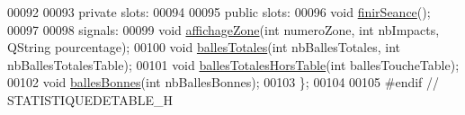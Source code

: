 \begin{DoxyCode}
00092 
00093     \textcolor{keyword}{private} slots:
00094 
00095     \textcolor{keyword}{public} slots:
00096         \textcolor{keywordtype}{void} \hyperlink{class_statistiques_seance_a72526ea18d6c534a1cb84576ef3ea28d}{finirSeance}();
00097 
00098     signals:
00099         \textcolor{keywordtype}{void} \hyperlink{class_statistiques_seance_a956ac10424a167d5b64fe13a92fbf121}{affichageZone}(\textcolor{keywordtype}{int} numeroZone, \textcolor{keywordtype}{int} nbImpacts, QString pourcentage);
00100         \textcolor{keywordtype}{void} \hyperlink{class_statistiques_seance_ac3c52002d12dd7b93e6339126c84190f}{ballesTotales}(\textcolor{keywordtype}{int} nbBallesTotales, \textcolor{keywordtype}{int} nbBallesTotalesTable);
00101         \textcolor{keywordtype}{void} \hyperlink{class_statistiques_seance_a02a327f2a69eed4208b7b2076c6a67f2}{ballesTotalesHorsTable}(\textcolor{keywordtype}{int} ballesToucheTable);
00102         \textcolor{keywordtype}{void} \hyperlink{class_statistiques_seance_aa3ee6b00dae44d1f3cf78349ba235b08}{ballesBonnes}(\textcolor{keywordtype}{int} nbBallesBonnes);
00103 \};
00104 
00105 \textcolor{preprocessor}{#endif // STATISTIQUEDETABLE\_H}
\end{DoxyCode}
